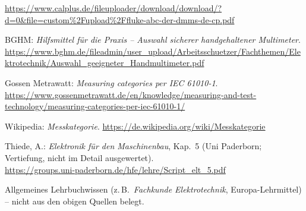 \documentclass[11pt,a4paper]{article}
\newcommand{\qziel}[1]{\hypertarget{src:#1}{\texttt{[#1]}}}
\begin{document}
\begin{description}[style=nextline,leftmargin=0pt,itemsep=3pt]
    \url{https://www.calplus.de/fileuploader/download/download/?d=0&file=custom%2Fupload%2Ffluke-abc-der-dmms-de-cp.pdf}
  \item[\qziel{BGHM}] BGHM: \emph{Hilfsmittel für die Praxis -- Auswahl sicherer handgehaltener Multimeter}.\\
    \url{https://www.bghm.de/fileadmin/user_upload/Arbeitsschuetzer/Fachthemen/Elektrotechnik/Auswahl_geeigneter_Handmultimeter.pdf}
  \item[\qziel{GM}] Gossen Metrawatt: \emph{Measuring categories per IEC 61010-1}.\\
    \url{https://www.gossenmetrawatt.de/en/knowledge/measuring-and-test-technology/measuring-categories-per-iec-61010-1/}
  \item[\qziel{WIKI}] Wikipedia: \emph{Messkategorie}. \url{https://de.wikipedia.org/wiki/Messkategorie}
  \item[\qziel{THIEDE}] Thiede, A.: \emph{Elektronik für den Maschinenbau}, Kap.\ 5 (Uni Paderborn; Vertiefung, nicht im Detail ausgewertet).\\
    \url{https://groups.uni-paderborn.de/hfe/lehre/Script_elt_5.pdf}
  \item[\qziel{LB}] Allgemeines Lehrbuchwissen (z.\,B.\ \emph{Fachkunde Elektrotechnik}, Europa-Lehrmittel) -- nicht aus den obigen Quellen belegt.
\end{description}
\end{document}

